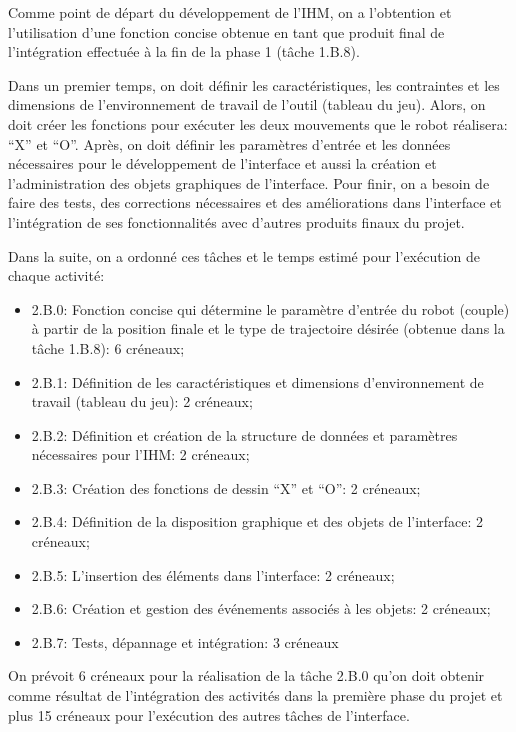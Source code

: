 
Comme point de départ du développement de l’IHM, on a l’obtention et l’utilisation d'une fonction concise obtenue en tant que produit final de l’intégration effectuée à la fin de la phase 1 (tâche 1.B.8).

Dans un premier temps, on doit définir les caractéristiques, les contraintes et  les dimensions de l’environnement de travail de l’outil (tableau du jeu). Alors, on doit créer les fonctions pour exécuter les deux mouvements que le robot réalisera: “X” et “O”. Après, on doit définir les paramètres d’entrée et les données nécessaires pour le développement de l’interface et aussi la création et l’administration des objets graphiques de l’interface. Pour finir, on a besoin de faire des tests, des corrections nécessaires et des améliorations dans l’interface et l’intégration de ses fonctionnalités avec d'autres produits finaux du projet. 

Dans la suite, on a ordonné ces tâches et le temps estimé pour l'exécution de chaque activité:
\begin{itemize}

\item	2.B.0: Fonction concise qui détermine le paramètre d’entrée du robot (couple) à partir de la position finale et le type de trajectoire désirée (obtenue dans la tâche 1.B.8): 6 créneaux; 
\item	2.B.1: Définition de les caractéristiques et dimensions d’environnement de travail (tableau du jeu): 2 créneaux;
\item	2.B.2: Définition et création de la structure de données et paramètres nécessaires pour l’IHM: 2 créneaux;
\item	2.B.3: Création des fonctions de dessin “X” et “O”: 2 créneaux;
\item	2.B.4: Définition de la disposition graphique et des objets de l’interface: 2 créneaux;
\item	2.B.5: L’insertion des éléments dans l’interface: 2 créneaux;
\item	2.B.6: Création et gestion des événements associés à les objets: 2 créneaux;
\item	2.B.7: Tests, dépannage et intégration: 3 créneaux

\end{itemize}

On prévoit 6 créneaux pour la réalisation de la tâche 2.B.0 qu'on doit obtenir comme résultat de l’intégration des activités dans la première phase du projet et plus 15 créneaux pour l’exécution des autres tâches de l'interface.
\pagebreak
